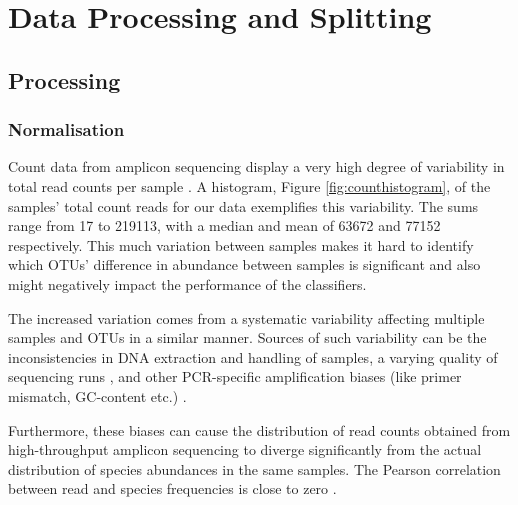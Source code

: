 
\chapter{Data Processing and Splitting}
\label{chap:data}
\ifpdf
    \graphicspath{{DataChapter/Figs/Raster/}{DataChapter/Figs/PDF/}{DataChapter/Figs/}}
\else
    \graphicspath{{DataChapter/Figs/Vector/}{DataChapter/Figs/}}
\fi



\section{Processing}
\subsection{Normalisation}

Count data from amplicon sequencing display a very high degree of variability in total read counts per sample \cite{inadmissible_rareying}. A histogram, Figure \ref{fig:counthistogram}, of the samples' total count reads for our data exemplifies this variability. The sums range from 17 to 219113, with a median and mean of 63672 and 77152 respectively. This much variation between samples makes it hard to identify which OTUs' difference in abundance between samples is significant and also might negatively impact the performance of the classifiers. 
 
 The increased variation comes from a systematic variability affecting multiple samples and OTUs in a similar manner. Sources of such variability can be the inconsistencies in DNA extraction and handling of samples,  a varying quality of sequencing runs \cite{pereira_comparison_2018}, and other PCR-specific amplification biases (like primer mismatch, GC-content etc.) \cite{abundance_nodate,krehenwinkel_estimating_2017}.
 
 Furthermore, these biases can cause the distribution of read counts obtained from high-throughput amplicon sequencing to diverge significantly from the actual distribution of species abundances in the same samples. The Pearson correlation between read and species frequencies is close to zero \cite{edgar_unbias:_2017}.
 
